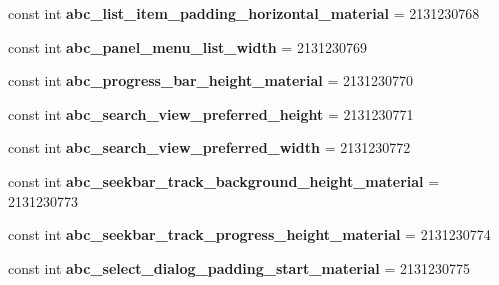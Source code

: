 \begin{DoxyCompactItemize}
\mbox{\label{classst_delivery_1_1_resource_1_1_dimension_a05cb526404e75dbbbe1356b627132b22}} 
const int {\bfseries abc\+\_\+list\+\_\+item\+\_\+padding\+\_\+horizontal\+\_\+material} = 2131230768
\item 
\mbox{\label{classst_delivery_1_1_resource_1_1_dimension_aef9c6b4e9eb8329c6607886e32dd98de}} 
const int {\bfseries abc\+\_\+panel\+\_\+menu\+\_\+list\+\_\+width} = 2131230769
\item 
\mbox{\label{classst_delivery_1_1_resource_1_1_dimension_ad70cff3b412c3ab984c2d82f5d882498}} 
const int {\bfseries abc\+\_\+progress\+\_\+bar\+\_\+height\+\_\+material} = 2131230770
\item 
\mbox{\label{classst_delivery_1_1_resource_1_1_dimension_ae6ffe2103a8b62d3e4f9123c3239ca2a}} 
const int {\bfseries abc\+\_\+search\+\_\+view\+\_\+preferred\+\_\+height} = 2131230771
\item 
\mbox{\label{classst_delivery_1_1_resource_1_1_dimension_a9dee62c81795e50d08682b192fcee759}} 
const int {\bfseries abc\+\_\+search\+\_\+view\+\_\+preferred\+\_\+width} = 2131230772
\item 
\mbox{\label{classst_delivery_1_1_resource_1_1_dimension_a435be880411fb4b091724171e54b2dd4}} 
const int {\bfseries abc\+\_\+seekbar\+\_\+track\+\_\+background\+\_\+height\+\_\+material} = 2131230773
\item 
\mbox{\label{classst_delivery_1_1_resource_1_1_dimension_aedd24c71ce77731da38342e88b9e31b8}} 
const int {\bfseries abc\+\_\+seekbar\+\_\+track\+\_\+progress\+\_\+height\+\_\+material} = 2131230774
\item 
\mbox{\label{classst_delivery_1_1_resource_1_1_dimension_a99cfead480cc654107d71b1cef54b3ee}} 
const int {\bfseries abc\+\_\+select\+\_\+dialog\+\_\+padding\+\_\+start\+\_\+material} = 2131230775
\item 

\end{DoxyCompactItemize}
